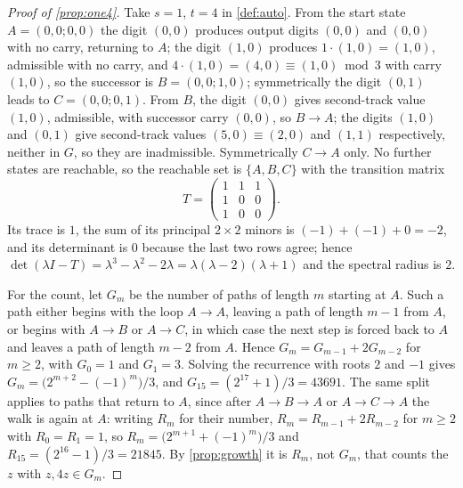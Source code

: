 \documentclass[11pt]{amsart}
\theoremstyle{definition}
\theoremstyle{remark}
\begin{document}
\begin{proof}[Proof of \cref{prop:one4}]
Take $s=1$, $t=4$ in \cref{def:auto}. From the start state $A=(0,0;0,0)$ the digit $(0,0)$ produces output digits $(0,0)$ and $(0,0)$ with no carry, returning to $A$; the digit $(1,0)$ produces $1\cdot(1,0)=(1,0)$, admissible with no carry, and $4\cdot(1,0)=(4,0)\equiv (1,0) \bmod 3$ with carry $(1,0)$, so the successor is $B=(0,0;1,0)$; symmetrically the digit $(0,1)$ leads to $C=(0,0;0,1)$. From $B$, the digit $(0,0)$ gives second-track value $(1,0)$, admissible, with successor carry $(0,0)$, so $B\to A$; the digits $(1,0)$ and $(0,1)$ give second-track values $(5,0)\equiv (2,0)$ and $(1,1)$ respectively, neither in $G$, so they are inadmissible. Symmetrically $C\to A$ only. No further states are reachable, so the reachable set is $\{A,B,C\}$ with the transition matrix
\[
T=\begin{pmatrix} 1&1&1\\ 1&0&0\\ 1&0&0\end{pmatrix}.
\]
Its trace is $1$, the sum of its principal $2\times 2$ minors is $(-1)+(-1)+0=-2$, and its determinant is $0$ because the last two rows agree; hence $\det(\lambda I-T)=\lambda^3-\lambda^2-2\lambda=\lambda(\lambda-2)(\lambda+1)$ and the spectral radius is $2$.

For the count, let $G_m$ be the number of paths of length $m$ starting at $A$. Such a path either begins with the loop $A\to A$, leaving a path of length $m-1$ from $A$, or begins with $A\to B$ or $A\to C$, in which case the next step is forced back to $A$ and leaves a path of length $m-2$ from $A$. Hence $G_m=G_{m-1}+2G_{m-2}$ for $m\ge 2$, with $G_0=1$ and $G_1=3$. Solving the recurrence with roots $2$ and $-1$ gives $G_m=\bigl(2^{m+2}-(-1)^m\bigr)/3$, and $G_{15}=(2^{17}+1)/3=43691$. The same split applies to paths that return to $A$, since after $A\to B\to A$ or $A\to C\to A$ the walk is again at $A$: writing $R_m$ for their number, $R_m=R_{m-1}+2R_{m-2}$ for $m\ge 2$ with $R_0=R_1=1$, so $R_m=\bigl(2^{m+1}+(-1)^m\bigr)/3$ and $R_{15}=(2^{16}-1)/3=21845$. By \cref{prop:growth} it is $R_m$, not $G_m$, that counts the $z$ with $z,4z\in G_m$.
\end{proof}
\end{document}
